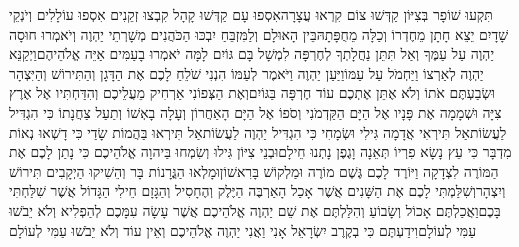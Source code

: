 \documentclass[../main/main.tex]{subfiles}
\begin{document}
\begin{multicols*}{\ncols}
תִּקְעוּ שׁוֹפָר בְּצִיּוֹן קַדְּשׁוּ צוֹם קִרְאוּ עֲצָרָה\PreVerseSpace{}אִסְפוּ עָם קַדְּשׁוּ קָהָל קִבְצוּ זְקֵנִים אִסְפוּ עוֹלָלִים וְיֹנְקֵי שָׁדָיִם יֵצֵא חָתָן מֵחֶדְרוֹ וְכַלָּה מֵחֻפָּתָהּ\PreVerseSpace{}בֵּין הָאוּלָם וְלַמִּזְבֵּחַ יִבְכּוּ הַכֹּהֲנִים מְשָׁרְתֵי יַהְוֶה וְיֹאמְרוּ חוּסָה יַהְוֶה עַל עַמֶּךָ וְאַל תִּתֵּן נַחֲלָתְךָ לְחֶרְפָּה לִמְשָׁל בָּם גּוֹיִם לָמָּה יֹאמְרוּ בָעַמִּים אַיֵּה אֱלֹהֵיהֶם\PreVerseSpace{}וַיְקַנֵּא יַהְוֶה לְאַרְצוֹ וַיַּחְמֹל עַל עַמּוֹ\PreVerseSpace{}וַיַּעַן יַהְוֶה וַיֹּאמֶר לְעַמּוֹ הִנְנִי שֹׁלֵחַ לָכֶם אֶת הַדָּגָן וְהַתִּירוֹשׁ וְהַיִּצְהָר וּשְׂבַעְתֶּם אֹתוֹ וְלֹא אֶתֵּן אֶתְכֶם עוֹד חֶרְפָּה בַּגּוֹיִם\PreVerseSpace{}וְאֶת הַצְּפוֹנִי אַרְחִיק מֵעֲלֵיכֶם וְהִדַּחְתִּיו אֶל אֶרֶץ צִיָּה וּשְׁמָמָה אֶת פָּנָיו אֶל הַיָּם הַקַּדְמֹנִי וְסֹפוֹ אֶל הַיָּם הָאַחֲרוֹן וְעָלָה בָאְשׁוֹ וְתַעַל צַחֲנָתוֹ כִּי הִגְדִּיל לַעֲשׂוֹת\PreVerseSpace{}אַל תִּירְאִי אֲדָמָה גִּילִי וּשְׂמָחִי כִּי הִגְדִּיל יַהְוֶה לַעֲשׂוֹת\PreVerseSpace{}אַל תִּירְאוּ בַּהֲמוֹת שָׂדַי כִּי דָשְׁאוּ נְאוֹת מִדְבָּר כִּי עֵץ נָשָׂא פִרְיוֹ תְּאֵנָה וָגֶפֶן נָתְנוּ חֵילָם\PreVerseSpace{}וּבְנֵי צִיּוֹן גִּילוּ וְשִׂמְחוּ בַּיהוָה אֱלֹהֵיכֶם כִּי נָתַן לָכֶם אֶת הַמּוֹרֶה לִצְדָקָה וַיּוֹרֶד לָכֶם גֶּשֶׁם מוֹרֶה וּמַלְקוֹשׁ בָּרִאשׁוֹן\PreVerseSpace{}וּמָלְאוּ הַגֳּרָנוֹת בָּר וְהֵשִׁיקוּ הַיְקָבִים תִּירוֹשׁ וְיִצְהָר\PreVerseSpace{}וְשִׁלַּמְתִּי לָכֶם אֶת הַשָּׁנִים אֲשֶׁר אָכַל הָאַרְבֶּה הַיֶּלֶק וְהֶחָסִיל וְהַגָּזָם חֵילִי הַגָּדוֹל אֲשֶׁר שִׁלַּחְתִּי בָּכֶם\PreVerseSpace{}וַאֲכַלְתֶּם אָכוֹל וְשָׂבוֹעַ וְהִלַּלְתֶּם אֶת שֵׁם יַהְוֶה אֱלֹהֵיכֶם אֲשֶׁר עָשָׂה עִמָּכֶם לְהַפְלִיא וְלֹא יֵבֹשׁוּ עַמִּי לְעוֹלָם\PreVerseSpace{}וִידַעְתֶּם כִּי בְקֶרֶב יִשְׂרָאֵל אָנִי וַאֲנִי יַהְוֶה אֱלֹהֵיכֶם וְאֵין עוֹד וְלֹא יֵבֹשׁוּ עַמִּי לְעוֹלָם\OpenSection{}\par

\end{multicols*}
\end{document}

